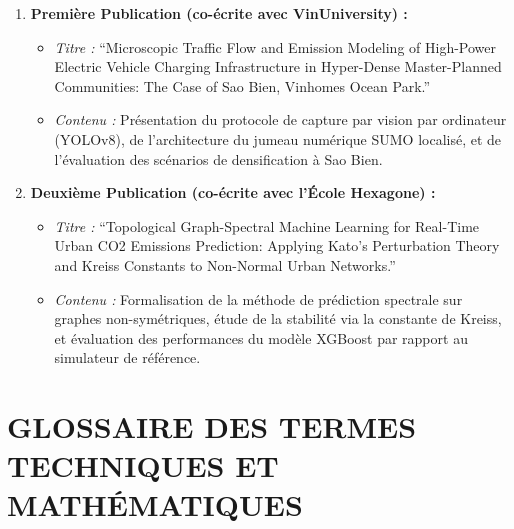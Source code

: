 \documentclass[11pt, a4paper]{article}
\providecommand{\tightlist}{}
\begin{document}
\begin{enumerate}
\def\labelenumi{\arabic{enumi}.}
\tightlist
\item
  \textbf{Première Publication (co-écrite avec VinUniversity) :}

  \begin{itemize}
  \tightlist
  \item
    \emph{Titre :} ``Microscopic Traffic Flow and Emission Modeling of
    High-Power Electric Vehicle Charging Infrastructure in Hyper-Dense
    Master-Planned Communities: The Case of Sao Bien, Vinhomes Ocean
    Park.''
  \item
    \emph{Contenu :} Présentation du protocole de capture par vision par
    ordinateur (YOLOv8), de l'architecture du jumeau numérique SUMO
    localisé, et de l'évaluation des scénarios de densification à Sao
    Bien.
  \end{itemize}
\item
  \textbf{Deuxième Publication (co-écrite avec l'École Hexagone) :}

  \begin{itemize}
  \tightlist
  \item
    \emph{Titre :} ``Topological Graph-Spectral Machine Learning for
    Real-Time Urban CO2 Emissions Prediction: Applying Kato's
    Perturbation Theory and Kreiss Constants to Non-Normal Urban
    Networks.''
  \item
    \emph{Contenu :} Formalisation de la méthode de prédiction spectrale
    sur graphes non-symétriques, étude de la stabilité via la constante
    de Kreiss, et évaluation des performances du modèle XGBoost par
    rapport au simulateur de référence.
  \end{itemize}
\end{enumerate}

\newpage

\section{GLOSSAIRE DES TERMES TECHNIQUES ET
MATHÉMATIQUES}\label{glossaire-des-termes-techniques-et-mathuxe9matiques}
\end{document}
